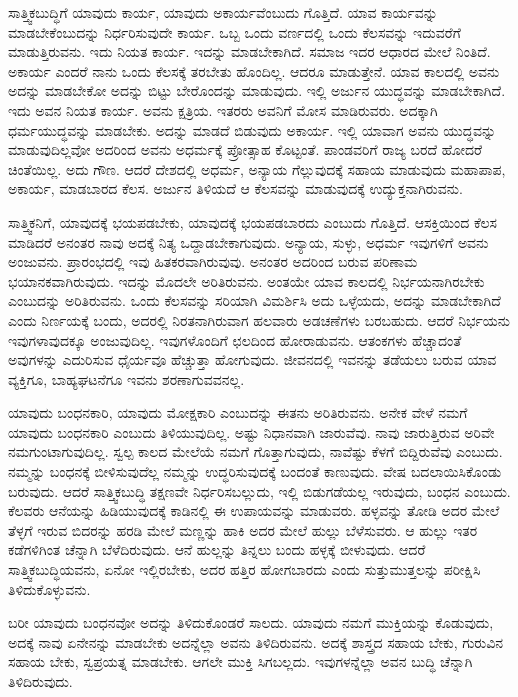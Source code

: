 ಸಾತ್ತ್ವಿಕಬುದ್ಧಿಗೆ ಯಾವುದು ಕಾರ್ಯ, ಯಾವುದು ಅಕಾರ್ಯವೆಂಬುದು ಗೊತ್ತಿದೆ. ಯಾವ ಕಾರ್ಯವನ್ನು ಮಾಡಬೇಕೆಂಬುದನ್ನು ನಿರ್ಧರಿಸುವುದೇ ಕಾರ್ಯ. ಒಬ್ಬ ಒಂದು ವರ್ಣದಲ್ಲಿ ಒಂದು ಕೆಲಸವನ್ನು ಇದುವರೆಗೆ ಮಾಡುತ್ತಿರುವನು. ಇದು ನಿಯತ ಕಾರ್ಯ. ಇದನ್ನು ಮಾಡಬೇಕಾಗಿದೆ. ಸಮಾಜ ಇದರ ಆಧಾರದ ಮೇಲೆ ನಿಂತಿದೆ. ಅಕಾರ್ಯ ಎಂದರೆ ನಾನು ಒಂದು ಕೆಲಸಕ್ಕೆ ತರಬೇತು ಹೊಂದಿಲ್ಲ. ಆದರೂ ಮಾಡುತ್ತೇನೆ. ಯಾವ ಕಾಲದಲ್ಲಿ ಅವನು ಅದನ್ನು ಮಾಡಬೇಕೋ ಅದನ್ನು ಬಿಟ್ಟು ಬೇರೊಂದನ್ನು ಮಾಡುವುದು. ಇಲ್ಲಿ ಅರ್ಜುನ ಯುದ್ಧವನ್ನು ಮಾಡಬೇಕಾಗಿದೆ. ಇದು ಅವನ ನಿಯತ ಕಾರ್ಯ. ಅವನು ಕ್ಷತ್ರಿಯ. ಇತರರು ಅವನಿಗೆ ಮೋಸ ಮಾಡಿರುವರು. ಅದಕ್ಕಾಗಿ ಧರ್ಮಯುದ್ಧವನ್ನು ಮಾಡಬೇಕು. ಅದನ್ನು ಮಾಡದೆ ಬಿಡುವುದು ಅಕಾರ್ಯ. ಇಲ್ಲಿ ಯಾವಾಗ ಅವನು ಯುದ್ಧವನ್ನು ಮಾಡುವುದಿಲ್ಲವೋ ಅದರಿಂದ ಅವನು ಅಧರ್ಮಕ್ಕೆ ಪ್ರೋತ್ಸಾಹ ಕೊಟ್ಟಂತೆ. ಪಾಂಡವರಿಗೆ ರಾಜ್ಯ ಬರದೆ ಹೋದರೆ ಚಿಂತೆಯಿಲ್ಲ. ಅದು ಗೌಣ. ಆದರೆ ದೇಶದಲ್ಲಿ ಅಧರ್ಮ, ಅನ್ಯಾಯ ಗೆಲ್ಲುವುದಕ್ಕೆ ಸಹಾಯ ಮಾಡುವುದು ಮಹಾಪಾಪ, ಅಕಾರ್ಯ, ಮಾಡಬಾರದ ಕೆಲಸ. ಅರ್ಜುನ ತಿಳಿಯದೆ ಆ ಕೆಲಸವನ್ನು ಮಾಡುವುದಕ್ಕೆ ಉದ್ಯುಕ್ತನಾಗಿರುವನು.

ಸಾತ್ತ್ವಿಕನಿಗೆ, ಯಾವುದಕ್ಕೆ ಭಯಪಡಬೇಕು, ಯಾವುದಕ್ಕೆ ಭಯಪಡಬಾರದು ಎಂಬುದು ಗೊತ್ತಿದೆ. ಆಸಕ್ತಿಯಿಂದ ಕೆಲಸ ಮಾಡಿದರೆ ಅನಂತರ ನಾವು ಅದಕ್ಕೆ ನಿತ್ಯ ಒದ್ದಾಡಬೇಕಾಗುವುದು. ಅನ್ಯಾಯ, ಸುಳ್ಳು, ಅಧರ್ಮ ಇವುಗಳಿಗೆ ಅವನು ಅಂಜುವನು. ಪ್ರಾರಂಭದಲ್ಲಿ ಇವು ಹಿತಕರವಾಗಿರುವುವು. ಅನಂತರ ಅದರಿಂದ ಬರುವ ಪರಿಣಾಮ ಭಯಾನಕವಾಗಿರುವುದು. ಇದನ್ನು ಮೊದಲೇ ಅರಿತಿರುವನು. ಅಂತಯೇ ಯಾವ ಕಾಲದಲ್ಲಿ ನಿರ್ಭಯನಾಗಿರಬೇಕು ಎಂಬುದನ್ನು ಅರಿತಿರುವನು. ಒಂದು ಕೆಲಸವನ್ನು ಸರಿಯಾಗಿ ವಿಮರ್ಶಿಸಿ ಅದು ಒಳ್ಳೆಯದು, ಅದನ್ನು ಮಾಡಬೇಕಾಗಿದೆ ಎಂದು ನಿರ್ಣಯಕ್ಕೆ ಬಂದು, ಅದರಲ್ಲಿ ನಿರತನಾಗಿರುವಾಗ ಹಲವಾರು ಅಡಚಣೆಗಳು ಬರಬಹುದು. ಆದರೆ ನಿರ್ಭಯನು ಇವುಗಳಾವುದಕ್ಕೂ ಅಂಜುವುದಿಲ್ಲ. ಇವುಗಳೊಂದಿಗೆ ಛಲದಿಂದ ಹೋರಾಡುವನು. ಆತಂಕಗಳು ಹೆಚ್ಚಾದಂತೆ ಅವುಗಳನ್ನು ಎದುರಿಸುವ ಧೈರ್ಯವೂ ಹೆಚ್ಚುತ್ತಾ ಹೋಗುವುದು. ಜೀವನದಲ್ಲಿ ಇವನನ್ನು ತಡೆಯಲು ಬರುವ ಯಾವ ವ್ಯಕ್ತಿಗೂ, ಬಾಹ್ಯಘಟನೆಗೂ ಇವನು ಶರಣಾಗುವವನಲ್ಲ.

ಯಾವುದು ಬಂಧನಕಾರಿ, ಯಾವುದು ಮೋಕ್ಷಕಾರಿ ಎಂಬುದನ್ನು ಈತನು ಅರಿತಿರುವನು. ಅನೇಕ ವೇಳೆ ನಮಗೆ ಯಾವುದು ಬಂಧನಕಾರಿ ಎಂಬುದು ತಿಳಿಯುವುದಿಲ್ಲ. ಅಷ್ಟು ನಿಧಾನವಾಗಿ ಜಾರುವೆವು. ನಾವು ಜಾರುತ್ತಿರುವ ಅರಿವೇ ನಮಗುಂಟಾಗುವುದಿಲ್ಲ. ಸ್ವಲ್ಪ ಕಾಲದ ಮೇಲೆಯೆ ನಮಗೆ ಗೊತ್ತಾಗುವುದು, ನಾವೆಷ್ಟು ಕೆಳಗೆ ಬಿದ್ದಿರುವೆವು ಎಂಬುದು. ನಮ್ಮನ್ನು ಬಂಧನಕ್ಕೆ ಬೀಳಿಸುವುದೆಲ್ಲ ನಮ್ಮನ್ನು ಉದ್ಧರಿಸುವುದಕ್ಕೆ ಬಂದಂತೆ ಕಾಣುವುದು. ವೇಷ ಬದಲಾಯಿಸಿಕೊಂಡು ಬರುವುದು. ಆದರೆ ಸಾತ್ತ್ವಿಕಬುದ್ಧಿ ತಕ್ಷಣವೇ ನಿರ್ಧರಿಸಬಲ್ಲುದು, ಇಲ್ಲಿ ಬಿಡುಗಡೆಯಲ್ಲ ಇರುವುದು, ಬಂಧನ ಎಂಬುದು. ಕೆಲವರು ಆನೆಯನ್ನು ಹಿಡಿಯುವುದಕ್ಕೆ ಕಾಡಿನಲ್ಲಿ ಈ ಉಪಾಯವನ್ನು ಮಾಡುವರು. ಹಳ್ಳವನ್ನು ತೋಡಿ ಅದರ ಮೇಲೆ ತೆಳ್ಳಗೆ ಇರುವ ಬಿದರನ್ನು ಹರಡಿ ಮೇಲೆ ಮಣ್ಣನ್ನು ಹಾಕಿ ಅದರ ಮೇಲೆ ಹುಲ್ಲು ಬೆಳೆಸುವರು. ಆ ಹುಲ್ಲು ಇತರ ಕಡೆಗಳಿಗಿಂತ ಚೆನ್ನಾಗಿ ಬೆಳೆದಿರುವುದು. ಆನೆ ಹುಲ್ಲನ್ನು ತಿನ್ನಲು ಬಂದು ಹಳ್ಳಕ್ಕೆ ಬೀಳುವುದು. ಆದರೆ ಸಾತ್ತ್ವಿಕಬುದ್ಧಿಯವನು, ಏನೋ ಇಲ್ಲಿರಬೇಕು, ಅದರ ಹತ್ತಿರ ಹೋಗಬಾರದು ಎಂದು ಸುತ್ತುಮುತ್ತಲನ್ನು ಪರೀಕ್ಷಿಸಿ ತಿಳಿದುಕೊಳ್ಳುವನು.

ಬರೀ ಯಾವುದು ಬಂಧನವೋ ಅದನ್ನು ತಿಳಿದುಕೊಂಡರೆ ಸಾಲದು. ಯಾವುದು ನಮಗೆ ಮುಕ್ತಿಯನ್ನು ಕೊಡುವುದು, ಅದಕ್ಕೆ ನಾವು ಏನೇನನ್ನು ಮಾಡಬೇಕು ಅದನ್ನೆಲ್ಲಾ ಅವನು ತಿಳಿದಿರು\-ವನು. ಅದಕ್ಕೆ ಶಾಸ್ತ್ರದ ಸಹಾಯ ಬೇಕು, ಗುರುವಿನ ಸಹಾಯ ಬೇಕು, ಸ್ವಪ್ರಯತ್ನ ಮಾಡಬೇಕು. ಆಗಲೇ ಮುಕ್ತಿ ಸಿಗಬಲ್ಲದು. ಇವುಗಳನ್ನೆಲ್ಲಾ ಅವನ ಬುದ್ಧಿ ಚೆನ್ನಾಗಿ ತಿಳಿದಿರುವುದು.

